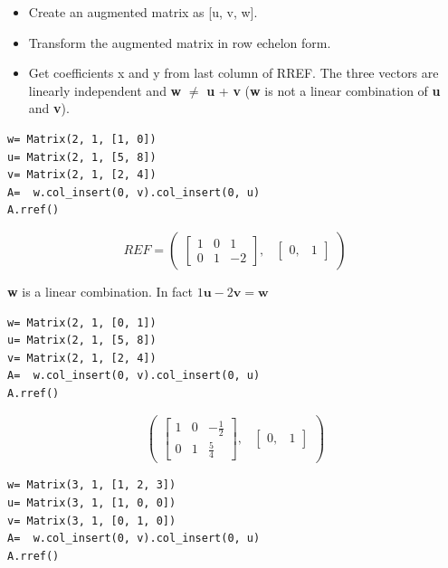 \begin{itemize}
\item Create an augmented matrix as [u, v, w].
\item Transform the augmented matrix in row echelon form.
\item Get coefficients x and y from last column of RREF. The three vectors are linearly
independent and \textbf{w} $\neq$ \textbf{u} + \textbf{v} (\textbf{w} is not a linear
combination of \textbf{u} and \textbf{v}).

\end{itemize}

\begin{verbatim}
w= Matrix(2, 1, [1, 0])
u= Matrix(2, 1, [5, 8])
v= Matrix(2, 1, [2, 4])
A=  w.col_insert(0, v).col_insert(0, u)
A.rref()
\end{verbatim}

\begin{equation}
REF= \begin{pmatrix}\left[\begin{matrix}1 & 0 & 1\\0 & 1 & -2\end{matrix}\right], & \begin{bmatrix}0, & 1\end{bmatrix}\end{pmatrix}
\end{equation}

\textbf{w} is a linear combination. In fact $1\mathbf{u} -2\mathbf{v}= \mathbf{w}$

\begin{verbatim}
w= Matrix(2, 1, [0, 1])
u= Matrix(2, 1, [5, 8])
v= Matrix(2, 1, [2, 4])
A=  w.col_insert(0, v).col_insert(0, u)
A.rref()
\end{verbatim}

\begin{equation}
\begin{pmatrix}\left[\begin{matrix}1 & 0 & - \frac{1}{2}\\0 & 1 & \frac{5}{4}\end{matrix}\right], & \begin{bmatrix}0, & 1\end{bmatrix}\end{pmatrix}
\end{equation}

\begin{verbatim}
w= Matrix(3, 1, [1, 2, 3])
u= Matrix(3, 1, [1, 0, 0])
v= Matrix(3, 1, [0, 1, 0])
A=  w.col_insert(0, v).col_insert(0, u)
A.rref()
\end{verbatim}

